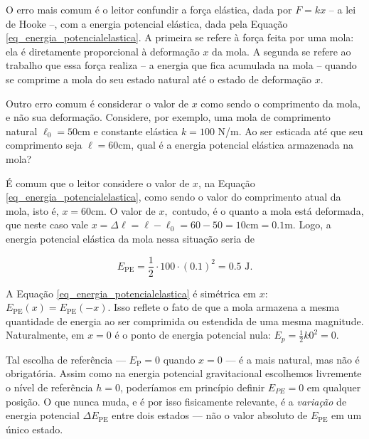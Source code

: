 
O erro mais comum é o leitor confundir a força elástica, dada por $F=kx$ -- a lei de Hooke --, com a energia potencial elástica, dada pela Equação \eqref{eq_energia_potencialelastica}. A primeira se refere à força feita por uma mola: ela é diretamente proporcional à deformação $x$ da mola. A segunda se refere ao trabalho que essa força realiza -- a energia que fica acumulada na mola -- quando se comprime a mola do seu estado natural até o estado de deformação $x.$

Outro erro comum é considerar o valor de $x$ como sendo o comprimento da mola, e não sua deformação. Considere, por exemplo, uma mola de comprimento natural $\ell_0 = 50 $cm e constante elástica $k=100$ N/m. Ao ser esticada até que seu comprimento seja $\ell= 60$cm, qual é a energia potencial elástica armazenada na mola?

É comum que o leitor considere o valor de $x$, na Equação \eqref{eq_energia_potencialelastica}, como sendo o valor do comprimento atual da mola, isto é, $x=60$cm. O valor de $x,$ contudo, é o quanto a mola está deformada, que neste caso vale $x=\Delta \ell = \ell - \ell_0 = 60 - 50 = 10 \text{cm} = 0.1 \text{m}$. Logo, a energia potencial elástica da mola nessa situação seria de 

$$ E_\text{PE} = \dfrac{1}{2} \cdot 100 \cdot (0.1)^2 = 0.5 \text{ J}.$$



A Equação \eqref{eq_energia_potencialelastica} é simétrica em $x$: $E_\text{PE}(x) = E_\text{PE}(-x)$. Isso reflete o fato de
que a mola armazena a mesma quantidade de energia ao ser comprimida ou estendida de uma
mesma magnitude.  Naturalmente, em $x=0$ é o ponto de energia potencial nula:  $E_p = \frac{1}{2}k 0^2 = 0.$






Tal escolha de referência --- $E_\text{P} = 0$ quando $x = 0$ --- é a mais natural, mas não
é obrigatória. Assim como na energia potencial gravitacional escolhemos livremente o nível
de referência $h = 0$, poderíamos em princípio definir $E_{PE} = 0$ em qualquer posição.
O que nunca muda, e é por isso fisicamente relevante, é a \textit{variação} de energia
potencial $\Delta E_\text{PE}$ entre dois estados --- não o valor absoluto de $E_\text{PE}$ em um
único estado.

